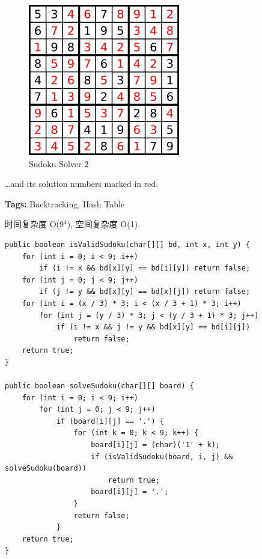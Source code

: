 \documentclass[12pt]{book}
\begin{document}
\begin{figure}[htb]
\centering
\includegraphics[width=.9\linewidth]{./pic/solveSudoku2.png}
\caption{Sudoku Solver 2}
\end{figure}
\ldots{}and its solution numbers marked in red.

\textbf{Tags:} Backtracking, Hash Table

时间复杂度 O(9$^{\text{4}}$), 空间复杂度 O(1). 

\lstset{language=java,label= ,caption= ,numbers=none}
\begin{lstlisting}
public boolean isValidSudoku(char[][] bd, int x, int y) {
    for (int i = 0; i < 9; i++) 
        if (i != x && bd[x][y] == bd[i][y]) return false;
    for (int j = 0; j < 9; j++) 
        if (j != y && bd[x][y] == bd[x][j]) return false;
    for (int i = (x / 3) * 3; i < (x / 3 + 1) * 3; i++) 
        for (int j = (y / 3) * 3; j < (y / 3 + 1) * 3; j++) 
            if (i != x && j != y && bd[x][y] == bd[i][j])
                return false;
    return true;
}

public boolean solveSudoku(char[][] board) {
    for (int i = 0; i < 9; i++)
        for (int j = 0; j < 9; j++) 
            if (board[i][j] == '.') {
                for (int k = 0; k < 9; k++) {
                    board[i][j] = (char)('1' + k);
                    if (isValidSudoku(board, i, j) && solveSudoku(board))
                        return true;
                    board[i][j] = '.';
                }
                return false;
            }
    return true;
}
\end{lstlisting}
\end{document}
